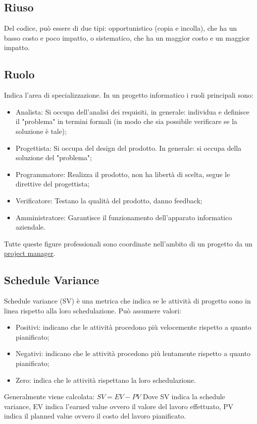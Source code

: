 	\subsection{Riuso}
	\label{sec:riuso}
	Del codice, può essere di due tipi: opportunistico (copia e incolla), che ha un basso costo e poco impatto, o sistematico, che ha un maggior costo e un maggior impatto.

	\subsection{Ruolo}
	\label{sec:ruolo}
	Indica l'area di specializzazione.
	In un progetto informatico i ruoli principali sono:
	\begin{itemize}
	\item Analista: Si occupa dell'analisi dei requisiti, in generale: individua e definisce il "problema" in termini formali (in modo che sia possibile verificare se la soluzione è tale);
	\item Progettista: Si occupa del design del prodotto. In generale: si occupa della soluzione del "problema";
	\item Programmatore: Realizza il prodotto, non ha libertà di scelta, segue le direttive del progettista;
	\item Verificatore: Testano la qualità del prodotto, danno feedback;
	\item Amministratore: Garantisce il funzionamento dell'apparato informatico aziendale.
	\end{itemize}
	Tutte queste figure professionali sono coordinate nell'ambito di un progetto da un \underline{\hyperref[sec:projectmanager]{project manager}}.
	\newpage


	\subsection{Schedule Variance}
	\label{sec:schedulevariance}
	Schedule variance (SV) è una metrica che indica se le attività di progetto sono in linea rispetto alla loro schedulazione.
	Può assumere valori:
	\begin{itemize}
	\item Positivi: indicano che le attività procedono più velocemente rispetto a quanto pianificato;
	\item Negativi: indicano che le attività procedono più lentamente rispetto a quanto pianificato;
	\item Zero: indica che le attività rispettano la loro schedulazione.
	\end{itemize}
	Generalmente viene calcolata: $SV = EV - PV$
	Dove SV indica la schedule variance, EV indica l'earned value ovvero il valore del lavoro effettuato, PV indica il planned value ovvero il costo del lavoro pianificato.

